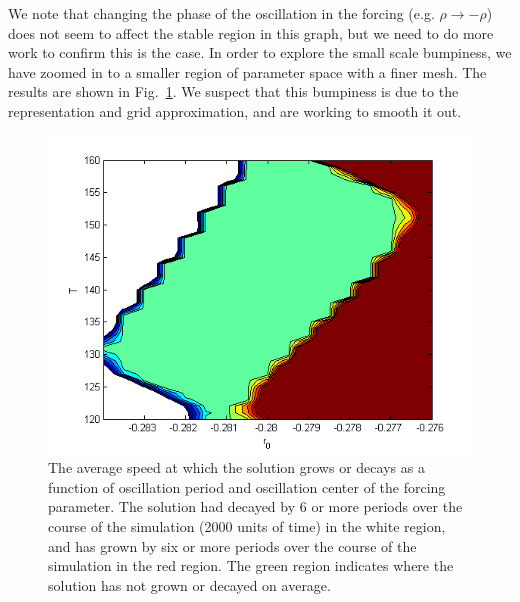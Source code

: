 \documentclass[pre,preprint,superscriptaddress]{revtex4-1}
\begin{document}
We note that changing the phase of the oscillation in the forcing (e.g. $\rho\rightarrow-\rho$) does not seem to affect the stable region in this graph, but we need to do more work to confirm this is the case.  In order to explore the small scale bumpiness, we have zoomed in to a smaller region of parameter space with a finer mesh.  The results are shown in Fig.~\ref{fig:Vcm01zoom}.  We suspect that this bumpiness is due to the representation and grid approximation, and are working to smooth it out.
\begin{figure}[h!]\center
\includegraphics[width=120mm]{Vcm01zoom.png}
\caption{The average speed at which the solution grows or decays as a function of oscillation period and oscillation center of the forcing parameter.  The solution had decayed by 6 or more periods over the course of the simulation (2000 units of time) in the white region, and has grown by six or more periods over the course of the simulation  in the red region.  The green region indicates where the solution has not grown or decayed on average.}
    \label{fig:Vcm01zoom}
\end{figure}
\end{document}
